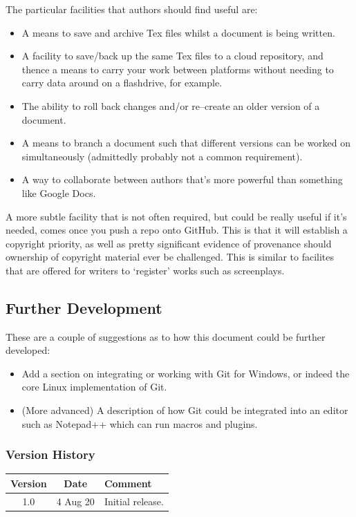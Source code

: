 \documentclass[a4paper, 12pt]{article}
\newcommand{\currentversion}{1.0}
\begin{document}
The particular facilities that authors should find useful are:
\begin{itemize}
\item A means to save and archive Tex files whilst a document is being written.
\item A facility to save/back up the same Tex files to a cloud repository, and thence a means to carry your work between platforms without needing to carry data around on a flashdrive, for example.
\item The ability to roll back changes and/or re--create an older version of a document.
\item A means to branch a document such that different versions can be worked on simultaneously (admittedly probably not a common requirement).
\item A way to collaborate between authors that's more powerful than something like Google Docs.
\end{itemize}
A more subtle facility that is not often required, but could be really useful if it's needed, comes once you push a repo onto GitHub. This is that it will establish a copyright priority, as well as pretty significant evidence of provenance should ownership of copyright material ever be challenged. This is similar to facilites that are offered for writers to `register' works such as screenplays.

\subsection{Further Development}
These are a couple of suggestions as to how this document could be further developed:
\begin{itemize}
\item Add a section on integrating or working with Git for Windows, or indeed the core Linux implementation of Git.
\item (More advanced) A description of how Git could be integrated into an editor such as Notepad++ which can run macros and plugins.
\end{itemize}



\subsubsection*{Version History}
\renewcommand{\arraystretch}{1.2}
\begin{table}[h]
\begin{tabular}{|c|c|p{60mm}|}
\hline
Version&Date&Comment\\
\hline
\currentversion&4 Aug 20&Initial release.\\
\hline
\end{tabular}
\end{table}
\end{document}
